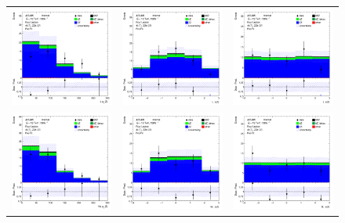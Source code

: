 \begin{figure}[htbp]
\centering
  \begin{tabular}{ccc}

    \includegraphics[width=.2\textwidth]{figures/PreFitPlots/lep4_ZZb_4T_0_Z_pt}&
    \includegraphics[width=.2\textwidth]{figures/PreFitPlots/lep4_ZZb_4T_0_Z_eta} &
    \includegraphics[width=.2\textwidth]{figures/PreFitPlots/lep4_ZZb_4T_0_Z_phi} \\
    \includegraphics[width=.2\textwidth]{figures/PreFitPlots/lep4_ZZb_4T_1_Z_pt}&
    \includegraphics[width=.2\textwidth]{figures/PreFitPlots/lep4_ZZb_4T_1_Z_eta} &
    \includegraphics[width=.2\textwidth]{figures/PreFitPlots/lep4_ZZb_4T_1_Z_phi} \\

\end{tabular}
\end{figure}
